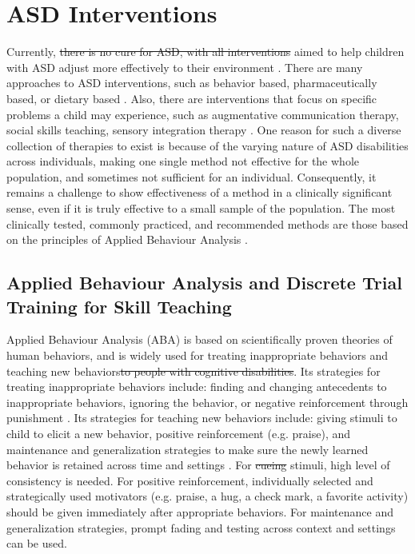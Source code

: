 \documentclass{ut-thesis}
\providecommand{\DIFaddtex}[1]{{\protect\color{blue}\uwave{#1}}} %
\providecommand{\DIFdeltex}[1]{{\protect\color{red}\sout{#1}}}                      %
\providecommand{\DIFaddbegin}{} %
\providecommand{\DIFaddend}{} %
\providecommand{\DIFdelbegin}{} %
\providecommand{\DIFdelend}{} %
\providecommand{\DIFadd}[1]{\texorpdfstring{\DIFaddtex{#1}}{#1}} %
\providecommand{\DIFdel}[1]{\texorpdfstring{\DIFdeltex{#1}}{}} %
\begin{document}
\section{ASD Interventions}

Currently, \DIFdelbegin \DIFdel{there is no cure for ASD, with all interventions }\DIFdelend \DIFaddbegin \DIFadd{interventions are mainly }\DIFaddend aimed to help children with ASD adjust more effectively to their environment \cite{francis2005autism}.  There are many approaches to ASD interventions, such as behavior based, pharmaceutically based, or dietary based \cite{francis2005autism}.  Also, there are interventions that focus on specific problems a child may experience, such as augmentative communication therapy, social skills teaching, sensory integration therapy \cite{francis2005autism}.  One reason for such a diverse collection of therapies to exist is because of the varying nature of ASD disabilities across individuals, making one single method not effective for the whole population, and sometimes not sufficient for an individual.  Consequently, it remains a challenge to show effectiveness of a method in a clinically significant sense, even if it is truly effective to a small sample of the population.  The most clinically tested, commonly practiced, and recommended methods are those based on the principles of Applied Behaviour Analysis \cite{foxx2008applied}.


\subsection{Applied Behaviour Analysis and Discrete Trial Training for Skill Teaching}
Applied Behaviour Analysis (ABA) is based on scientifically proven theories of human behaviors, and is widely used for treating inappropriate behaviors and teaching new behaviors\DIFdelbegin \DIFdel{to people with cognitive disabilities}\DIFdelend .  Its strategies for treating inappropriate behaviors include: finding and changing antecedents to inappropriate behaviors, ignoring the behavior, or negative reinforcement through punishment \cite{foxx1982decreasing}.  Its strategies for teaching new behaviors include: giving stimuli to child to elicit a new behavior, positive reinforcement (e.g. praise), and maintenance and generalization strategies to make sure the newly learned behavior is retained across time and settings \cite{foxx1982decreasing}.  For \DIFdelbegin \DIFdel{cueing }\DIFdelend \DIFaddbegin \DIFadd{cuing }\DIFaddend stimuli, high level of consistency is needed.  For positive reinforcement, individually selected and strategically used motivators (e.g. praise, a hug, a check mark, a favorite activity) should be given immediately after appropriate behaviors.  For maintenance and generalization strategies, prompt fading and testing across context and settings can be used.
\end{document}
